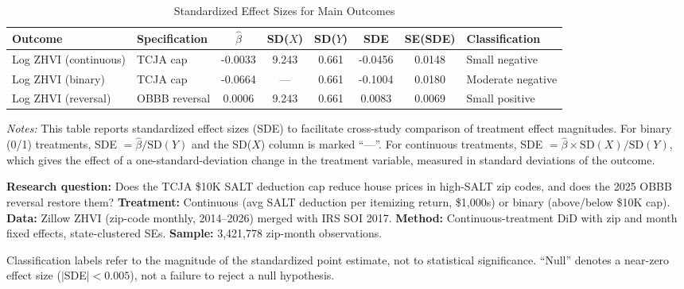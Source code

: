 \begin{table}[H]
\centering
\caption{Standardized Effect Sizes for Main Outcomes}
\label{tab:sde}
\begin{adjustbox}{max width=\textwidth}
\begin{tabular}{llcccccl}
\toprule
Outcome & Specification & $\hat{\beta}$ & SD($X$) & SD($Y$) & SDE & SE(SDE) & Classification \\
\midrule
Log ZHVI (continuous) & TCJA cap & -0.0033 & 9.243 & 0.661 & -0.0456 & 0.0148 & Small negative \\
Log ZHVI (binary) & TCJA cap & -0.0664 & --- & 0.661 & -0.1004 & 0.0180 & Moderate negative \\
Log ZHVI (reversal) & OBBB reversal & 0.0006 & 9.243 & 0.661 & 0.0083 & 0.0069 & Small positive \\
\bottomrule
\end{tabular}
\end{adjustbox}
\par\vspace{0.3em}
{\footnotesize \emph{Notes:} This table reports standardized effect sizes (SDE) to facilitate cross-study comparison of treatment effect magnitudes. For binary (0/1) treatments, SDE $= \hat{\beta} / \text{SD}(Y)$ and the SD($X$) column is marked ``---''. For continuous treatments, SDE $= \hat{\beta} \times \text{SD}(X) / \text{SD}(Y)$, which gives the effect of a one-standard-deviation change in the treatment variable, measured in standard deviations of the outcome.

\textbf{Research question:} Does the TCJA \$10K SALT deduction cap reduce house prices in high-SALT zip codes, and does the 2025 OBBB reversal restore them?
\textbf{Treatment:} Continuous (avg SALT deduction per itemizing return, \$1,000s) or binary (above/below \$10K cap).
\textbf{Data:} Zillow ZHVI (zip-code monthly, 2014--2026) merged with IRS SOI 2017.
\textbf{Method:} Continuous-treatment DiD with zip and month fixed effects, state-clustered SEs.
\textbf{Sample:} 3,421,778 zip-month observations.

Classification labels refer to the magnitude of the standardized point estimate, not to statistical significance. ``Null'' denotes a near-zero effect size ($|$SDE$| < 0.005$), not a failure to reject a null hypothesis.}
\end{table}

